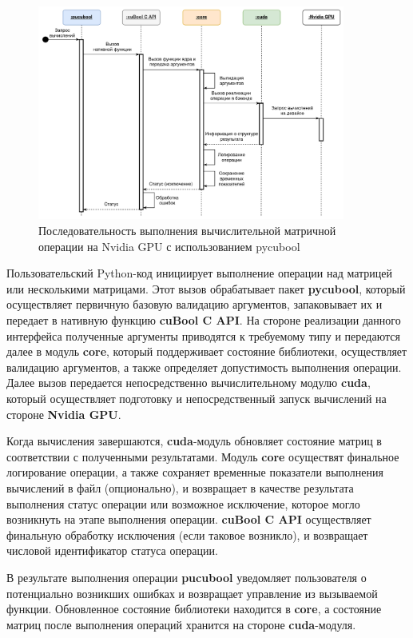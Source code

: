 \begin{figure}[h]
    \centering
    \includegraphics[width=0.9\textwidth]{images/library_sequence_use.png}
    \caption{Последовательность выполнения вычислительной матричной операции на Nvidia GPU с использованием pycubool}
    \label{fig:cubool_sequence}
\end{figure}

Пользовательский Python-код инициирует выполнение операции над матрицей или несколькими матрицами.
Этот вызов обрабатывает пакет \textbf{pycubool}, который осуществляет первичную базовую валидацию аргументов, запаковывает их и передает в нативную функцию \textbf{cuBool C API}.
На стороне реализации данного интерфейса полученные аргументы приводятся к требуемому типу и передаются далее в модуль \textbf{core}, 
который поддерживает состояние библиотеки, 
осуществляет валидацию аргументов, а также определяет допустимость выполнения операции. 
Далее вызов передается непосредственно вычислительному модулю \textbf{cuda}, 
который осуществляет подготовку и непосредственный запуск вычислений на стороне \textbf{Nvidia GPU}. 

Когда вычисления завершаются, \textbf{cuda}-модуль обновляет состояние матриц в соответствии с полученными результатами. 
Модуль \textbf{core} осуществят финальное логирование операции, 
а также сохраняет временные показатели выполнения вычислений в файл (опционально), 
и возвращает в качестве результата выполнения статус операции или возможное исключение, 
которое могло возникнуть на этапе выполнения операции. 
\textbf{cuBool C API} осуществляет финальную обработку исключения (если таковое возникло), 
и возвращает числовой идентификатор статуса операции. 

В результате выполнения операции \textbf{pucubool} уведомляет пользователя о потенциально возникших ошибках и возвращает управление из вызываемой функции. 
Обновленное состояние библиотеки находится в \textbf{core}, а состояние матриц после выполнения операций хранится на стороне \textbf{cuda}-модуля. 